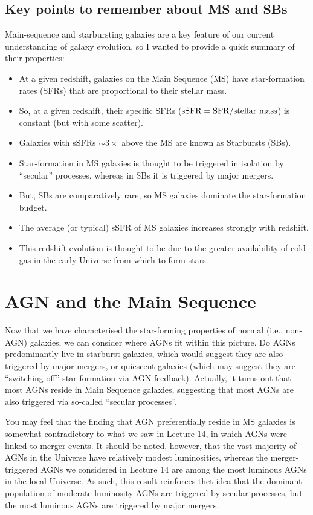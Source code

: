 \documentclass[11pt]{article}
\begin{document}
\subsection{Key points to remember about MS and SBs}
Main-sequence and starbursting galaxies are a key feature of our
current understanding of galaxy evolution, so I wanted to provide a
quick summary of their properties:

\begin{itemize}

\item At a given redshift, galaxies on the Main Sequence (MS) have
  star-formation rates (SFRs) that are proportional to their stellar
  mass.
\item So, at a given redshift, their specific SFRs
  (${\rm sSFR=SFR/stellar~mass}$) is constant (but with some scatter).
\item  Galaxies with sSFRs $\sim3\times$ above the MS are known as Starbursts (SBs).
\item Star-formation in MS galaxies is thought to be triggered in
  isolation by ``secular'' processes, whereas in SBs it is triggered
  by major mergers.
\item But, SBs are comparatively rare, so MS galaxies
  dominate the star-formation budget.
\item The average (or typical) sSFR of MS galaxies increases strongly
  with redshift.
\item This redshift evolution is thought to be due to the greater availability of cold gas in the
  early Universe from which to form stars.
\end{itemize}

\section{AGN and the Main Sequence}
Now that we have characterised the star-forming properties of normal
(i.e., non-AGN) galaxies, we can consider where AGNs fit within this
picture. Do AGNs predominantly live in starburst galaxies, which would
suggest they are also triggered by major mergers, or quiescent
galaxies (which may suggest they are ``switching-off'' star-formation
via AGN feedback). Actually, it turns out that most AGNs reside in
Main Sequence galaxies, suggesting that most AGNs are also triggered
via so-called ``secular processes''.

You may feel that the finding that AGN preferentially reside in MS
galaxies is somewhat contradictory to what we saw in Lecture 14, in
which AGNs were linked to merger events. It should be noted, however,
that the vast majority of AGNs in the Universe have relatively modest
luminosities, whereas the merger-triggered AGNs we considered in
Lecture 14 are among the most luminous AGNs in the local Universe. As
such, this result reinforces thet idea that the dominant population of
moderate luminosity AGNs are triggered by secular processes, but the
most luminous AGNs are triggered by major mergers.
\end{document}
